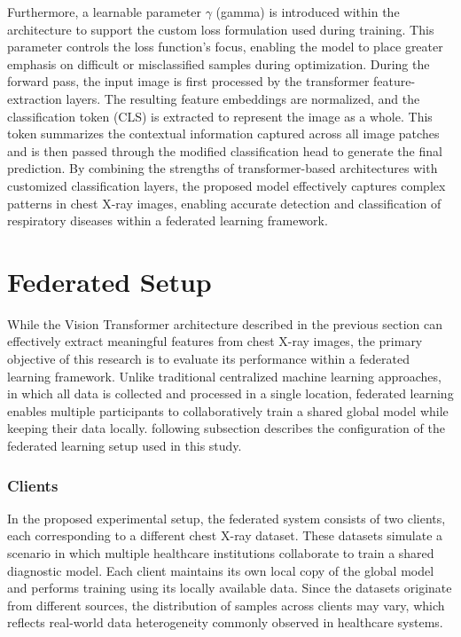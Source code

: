 \documentclass[12pt]{book}
\begin{document}
Furthermore, a learnable parameter $\gamma$ (gamma) is introduced within the architecture to support the custom loss formulation used during training. This parameter controls the loss function's focus, enabling the model to place greater emphasis on difficult or misclassified samples during optimization.
During the forward pass, the input image is first processed by the transformer feature-extraction layers. The resulting feature embeddings are normalized, and the classification token (CLS) is extracted to represent the image as a whole. This token summarizes the contextual information captured across all image patches and is then passed through the modified classification head to generate the final prediction.
By combining the strengths of transformer-based architectures with customized classification layers, the proposed model effectively captures complex patterns in chest X-ray images, enabling accurate detection and classification of respiratory diseases within a federated learning framework.

\section{Federated Setup}

While the Vision Transformer architecture described in the previous section can effectively extract meaningful features from chest X-ray images, the primary objective of this research is to evaluate its performance within a federated learning framework. Unlike traditional centralized machine learning approaches, in which all data is collected and processed in a single location, federated learning enables multiple participants to collaboratively train a shared global model while keeping their data locally.
\The following subsection describes the configuration of the federated learning setup used in this study.
\subsubsection{Clients}{}
In the proposed experimental setup, the federated system consists of two clients, each corresponding to a different chest X-ray dataset. These datasets simulate a scenario in which multiple healthcare institutions collaborate to train a shared diagnostic model.
Each client maintains its own local copy of the global model and performs training using its locally available data. Since the datasets originate from different sources, the distribution of samples across clients may vary, which reflects real-world data heterogeneity commonly observed in healthcare systems.
\end{document}
